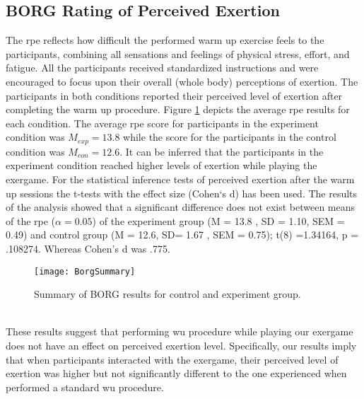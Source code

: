 \subsection{BORG Rating of Perceived Exertion}
The \acrfull{rpe} reflects how difficult the performed warm up exercise feels to the participants, combining all sensations and feelings of physical stress, effort, and fatigue. All the participants received standardized instructions and were encouraged to focus upon their overall (whole body) perceptions of exertion. The participants in both conditions reported their perceived level of exertion after completing the warm up procedure.  Figure \ref{fig:borg} depicts the average \gls{rpe}  results for each condition. The average \gls{rpe} score for participants in the experiment condition was   \begin{math}M_{exp} = 13.8 \end{math} while the score for the participants in the control condition was   \begin{math}M_{con} = 12.6 \end{math}. It can be inferred that the participants in the experiment condition reached higher levels of exertion while playing the exergame. For the statistical inference tests of perceived exertion after the warm up sessions the t-tests with the effect size (Cohen`s d) has been used. The results of the analysis showed that a significant difference does not exist  between means of the \gls{rpe} (\begin{math}\alpha = 0.05\end{math})  of the experiment group (M = 13.8 , SD = 1.10, SEM = 0.49) and control group (M = 12.6, SD= 1.67 , SEM = 0.75);  t(8) =1.34164, p = .108274. Whereas Cohen's d was .775.
\\
\begin{figure}[h]
    \centering
    \texttt{[image: BorgSummary]}
    \caption{Summary of BORG results for control and experiment group.}
    \label{fig:borg}
\end{figure}\\
These results suggest that performing \acrshort{wu} procedure while playing our exergame does not have an effect on perceived exertion level. Specifically, our results imply that when participants interacted with the exergame, their perceived level of exertion was higher but not significantly different to the one experienced when performed a standard \acrshort{wu} procedure.
